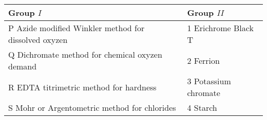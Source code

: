 \begin{center}
		
\begin{tabular}{ |l| l|}
\hline
Group $I$ &  Group $II$ \\ 
\hline
P Azide modified Winkler method for dissolved oxyzen & 1 Erichrome Black T \\
\hline
Q Dichromate method for chemical oxyzen demand & 2 Ferrion \\
\hline
R EDTA titrimetric method for hardness & 3 Potassium chromate  \\
\hline
S Mohr or Argentometric method for chlorides &  4 Starch \\
\hline


\end{tabular}
\end{center}

